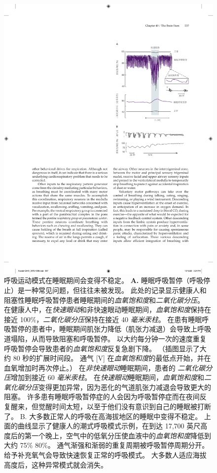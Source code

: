 \begin{figure}[htbp]
	\centering
	\includegraphics[width=0.72\linewidth]{chap40/fig_40_10}
	\caption{呼吸运动模式在睡眠期间会变得不稳定。
		\textbf{A.} 睡眠呼吸暂停（呼吸停止）是一种常见问题，但往往未被发现。
		此处的记录显示健康人和阻塞性睡眠呼吸暂停患者睡眠期间的\textit{血氧饱和度}和\textit{二氧化碳分压}。
		在健康人中，在\textit{快速眼动}和非快速眼动睡眠期间，\textit{血氧饱和度}保持在接近 100\%，\textit{二氧化碳分压}保持在接近 40 \textit{毫米汞柱}。
		在患有睡眠呼吸暂停的患者中，睡眠期间肌张力降低（肌张力减退）会导致上呼吸道塌陷，从而导致阻塞和呼吸暂停。
		以大约每分钟一次的速度重复呼吸暂停会导致患者的\textit{血氧饱和度}反复急剧下降。
		（插图显示了大约 80 秒的扩展时间段。
		通气 [V] 在\textit{血氧饱和度}的最低点开始，并在血氧增加时再次停止。）
		在\textit{非快速眼动}睡眠期间，患者的 \textit{二氧化碳分压}增加到接近 60 \textit{毫米汞柱}。 
		在\textit{快速眼动}睡眠期间，\textit{血氧饱和度}和\textit{二氧化碳分压}变得更加异常，因为恶化的气道肌张力减退会导致更大的阻塞。
		许多患有睡眠呼吸暂停症的人会因为呼吸暂停症而在夜间反复醒来，但觉醒时间太短，以至于他们没有意识到自己的睡眠被打断了\cite{grunstein1990neural}。 
		B. 大多数正常人的呼吸在高海拔地区的睡眠中变得不稳定。
		上面的曲线显示了健康人的潮式呼吸模式示例，在到达 17,700 英尺高度后的第一个晚上，空气中的低氧分压使血液中的\textit{血氧饱和度}降低到大约 75\% 80\%。
		通气渐强和渐弱的重复周期被呼吸暂停周期分开。
		给予补充氧气会导致快速恢复正常的呼吸模式。
		大多数人适应海拔高度后，这种异常模式就会消失\cite{lahiri1984sleep}。}
	\label{fig:40_10}
\end{figure}



